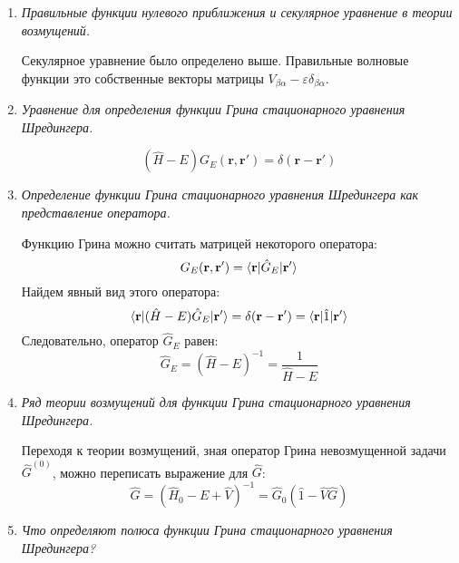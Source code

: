 \documentclass{article}
\begin{document}
\begin{enumerate}
		\item \textit{Правильные функции нулевого приближения и секулярное уравнение в теории возмущений.}
		
		Секулярное уравнение было определено выше. Правильные волновые функции это собственные векторы матрицы $V_{\beta\alpha} - \varepsilon \delta_{\beta\alpha}$.
		
		\item \textit{Уравнение для определения функции Грина стационарного уравнения Шредингера.}
		
		\begin{equation}
			(\hat{H} - E) G_E(\textbf{r}, \textbf{r}') = \delta(\textbf{r} - \textbf{r}')
		\end{equation}
		\item \textit{Определение функции Грина стационарного уравнения Шредингера как представление оператора.}
		
		Функцию Грина можно считать матрицей некоторого оператора:
		\begin{equation}
			G_E(\textbf{r}, \textbf{r}') = \braket{\textbf{r}|\hat{G}_E|\textbf{r}'}
		\end{equation}
		Найдем явный вид этого оператора:
		\begin{equation}
			\braket{\textbf{r}|(\hat{H} - E)\hat{G}_E | \textbf{r}'} = \delta (\textbf{r} - \textbf{r}') = \braket{\textbf{r}|\hat{1}| \textbf{r}'}
		\end{equation}
		Следовательно, оператор $\hat{G}_E$ равен:
		\begin{equation}
			\hat{G}_E = (\hat{H} - E)^{-1} = \frac{1}{\hat{H} - E}
		\end{equation}
		
		\item \textit{Ряд теории возмущений для функции Грина стационарного уравнения Шредингера.}
		
		Переходя к теории возмущений, зная оператор Грина невозмущенной задачи $\hat{G}^{(0)}$, можно переписать выражение для $\hat{G}$:
		\begin{equation}
			\hat{G} = (\hat{H}_0 - E + \hat{V})^{-1} = \hat{G}_0 (\hat{1} - \hat{V}\hat{G})
		\end{equation}
		
		
		\item \textit{Что определяют полюса функции Грина стационарного уравнения Шредингера?}				
		

\end{enumerate}
\end{document}
